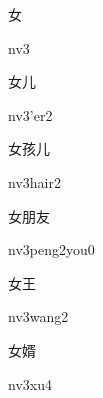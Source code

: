 \begin{verbete}[nv3]{女}
\begin{pronuncia}{nv3}
\end{pronuncia}
\end{verbete}

\begin{verbete}[nv3'er2]{女儿}
\begin{pronuncia}{nv3'er2}
\end{pronuncia}
\end{verbete}

\begin{verbete}[nv3hair2]{女孩儿}
\begin{pronuncia}{nv3hair2}
\end{pronuncia}
\end{verbete}

\begin{verbete}{女朋友}
\begin{pronuncia}{nv3peng2you0}
\end{pronuncia}
\end{verbete}

\begin{verbete}[nv3wang2]{女王}
\begin{pronuncia}{nv3wang2}
\end{pronuncia}
\end{verbete}

\begin{verbete}[nv3xu4]{女婿}
\begin{pronuncia}{nv3xu4}
\end{pronuncia}
\end{verbete}

